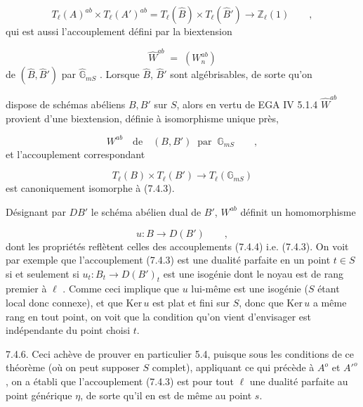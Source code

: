\begin{equation}\tag{7.4.3}
T_{\ell}(A)^{ab} \times T_{\ell}(A')^{ab} = T_{\ell}(\hat{B}) \times T_{\ell}(\hat{B}') \longrightarrow \mathbb{Z}_{\ell}(1) \qquad ,
\end{equation}
qui est aussi l'accouplement défini par la biextension

\begin{equation*}
\hat{W}^{ab} \;=\; (W_{n}^{ab})
\end{equation*}
de $(\hat{B},\hat{B}')$ par $\hat{\mathbb{G}}_{mS}$ . Lorsque $\hat{B}$, $\hat{B}'$ sont algébrisables, de sorte qu'on



dispose de schémas abéliens $B,B'$ sur $S$, alors en vertu de EGA IV 5.1.4 $\hat{W}^{ab}$ provient d'une biextension, définie à isomorphisme unique près,

\begin{equation*}
W^{ab} \quad \text{de} \quad (B,B') \;\; \text{par} \;\; \mathbb{G}_{mS} \qquad ,
\end{equation*}
et l'accouplement correspondant

\begin{equation}\tag{7.4.4}
T_{\ell}(B) \times T_{\ell}(B') \longrightarrow T_{\ell}(\mathbb{G}_{mS})
\end{equation}
est canoniquement isomorphe à (7.4.3).

Désignant par $DB'$ le schéma abélien dual de $B'$, $W^{ab}$ définit un homomorphisme

\begin{equation}\tag{7.4.5}
u : B \longrightarrow D(B') \qquad ,
\end{equation}
dont les propriétés reflètent celles des accouplements (7.4.4) i.e. (7.4.3). On voit par exemple que l'accouplement (7.4.3) est une dualité parfaite en un point $t \in S$ si et seulement si $u_{t} : B_{t} \longrightarrow D(B')_{t}$ est une isogénie dont le noyau est de rang premier à $\ell$ . Comme ceci implique que $u$ lui-même est une isogénie ($S$ étant local donc connexe), et que $\mathrm{Ker}\,u$ est plat et fini sur $S$, donc que $\mathrm{Ker}\,u$ a même rang en tout point, on voit que la condition qu'on vient d'envisager est indépendante du point choisi $t$.

7.4.6. Ceci achève de prouver en particulier 5.4, puisque sous les conditions de ce théorème (où on peut supposer $S$ complet), appliquant ce qui précède à $A^{o}$ et ${A'}^{o}$, on a établi que l'accouplement (7.4.3) est pour tout $\ell$ une dualité parfaite au point générique $\eta$, de sorte qu'il en est de même au point $s$.


